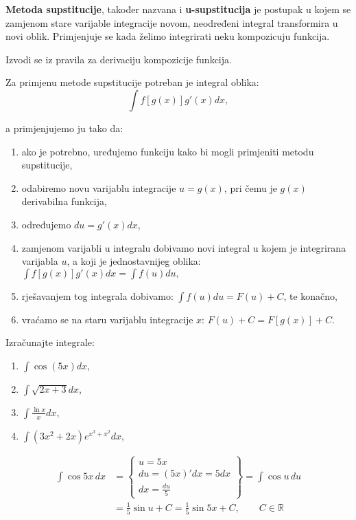 \textbf{Metoda supstitucije}, također nazvana i \textbf{u-supstitucija} je
postupak u kojem se zamjenom stare varijable integracije novom, neodređeni
integral transformira u novi oblik. Primjenjuje se kada želimo integrirati neku
kompozicuju funkcija.

Izvodi se iz pravila za derivaciju kompozicije funkcija.

\bigskip
\noindent
Za primjenu metode supstitucije potreban je integral oblika:
$$
\int f[g(x)]g'(x)dx,
$$

\noindent
a primjenjujemo ju tako da:
\begin{enumerate}
    \item ako je potrebno, uređujemo funkciju kako bi mogli primjeniti metodu
    supstitucije,
    \item odabiremo novu varijablu integracije $u = g(x)$, pri čemu je $g(x)$
    derivabilna funkcija,
    \item određujemo $du = g'(x)dx$,
    \item zamjenom varijabli u integralu dobivamo novi integral u kojem je
    integrirana varijabla $u$, a koji je jednostavnijeg oblika: $\displaystyle
    \int f[g(x)]g'(x)dx = \int f(u)du,$
    \item rješavanjem tog integrala dobivamo: $\displaystyle \int f(u)du = F(u)
    + C$, te konačno,
    \item vraćamo se na staru varijablu integracije $x$: $F(u) + C = F[g(x)] +
    C.$
\end{enumerate}

\begin{example}
    Izračunajte integrale:
    \begin{enumerate}
        \item $\displaystyle \int \cos (5x) dx$,
        \item $\displaystyle \int \sqrt{2x + 3} dx$,
        \item $\displaystyle \int \frac{\ln x}{x} dx$,
        \item $\displaystyle \int (3x^2+2x)e^{x^3+x^2} dx$,
    \end{enumerate}
\end{example}

\begin{align*}
\int \cos 5x\,dx &= \begin{Bmatrix} u = 5x \\ du = (5x)'dx = 5dx \\ dx = \frac{du}{5} \end{Bmatrix} = \int \cos u\,du \\
                 &= \frac{1}{5}\sin u + C = \frac{1}{5}\sin 5x + C, \qquad C \in \mathbb{R}
\end{align*}

